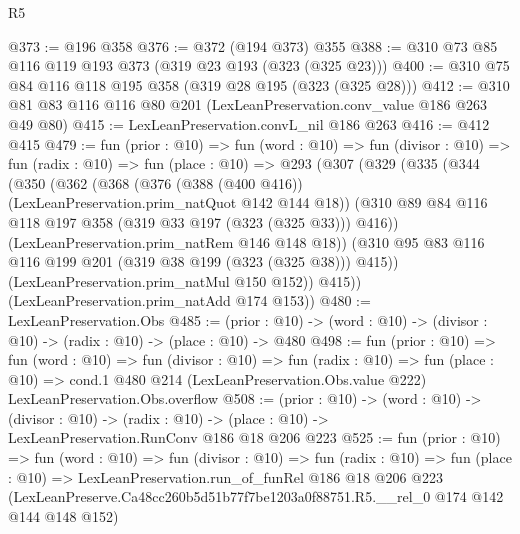\begin{lexlean}{R5}
\begin{coremodule}
@373 := @196 @358
@376 := @372 (@194 @373) @355
@388 := @310 @73 @85 @116 @119 @193 @373 (@319 @23 @193 (@323 (@325 @23)))
@400 := @310 @75 @84 @116 @118 @195 @358 (@319 @28 @195 (@323 (@325 @28)))
@412 := @310 @81 @83 @116 @116 @80 @201 (LexLeanPreservation.conv_value @186 @263 @49 @80)
@415 := LexLeanPreservation.convL_nil @186 @263
@416 := @412 @415
@479 := fun (prior : @10) =>
  fun (word : @10) =>
  fun (divisor : @10) =>
  fun (radix : @10) =>
  fun (place : @10) =>
  @293
    (@307
      (@329
        (@335
          (@344
            (@350
              (@362
                (@368
                  (@376 (@388 (@400 @416)) (LexLeanPreservation.prim_natQuot @142 @144 @18))
                  (@310 @89 @84 @116 @118 @197 @358 (@319 @33 @197 (@323 (@325 @33))) @416))
                (LexLeanPreservation.prim_natRem @146 @148 @18))
              (@310 @95 @83 @116 @116 @199 @201 (@319 @38 @199 (@323 (@325 @38))) @415))
            (LexLeanPreservation.prim_natMul @150 @152))
          @415))
      (LexLeanPreservation.prim_natAdd @174 @153))
@480 := LexLeanPreservation.Obs
@485 := (prior : @10) -> (word : @10) -> (divisor : @10) -> (radix : @10) -> (place : @10) -> @480
@498 := fun (prior : @10) =>
  fun (word : @10) =>
  fun (divisor : @10) =>
  fun (radix : @10) =>
  fun (place : @10) =>
  cond.{1} @480 @214 (LexLeanPreservation.Obs.value @222) LexLeanPreservation.Obs.overflow
@508 := (prior : @10) ->
  (word : @10) ->
  (divisor : @10) ->
  (radix : @10) -> (place : @10) -> LexLeanPreservation.RunConv @186 @18 @206 @223
@525 := fun (prior : @10) =>
  fun (word : @10) =>
  fun (divisor : @10) =>
  fun (radix : @10) =>
  fun (place : @10) =>
  LexLeanPreservation.run_of_funRel
    @186
    @18
    @206
    @223
    (LexLeanPreserve.Ca48cc260b5d51b77f7be1203a0f88751.R5.__rel_0 @174 @142 @144 @148 @152)
\end{coremodule}
\end{lexlean}
